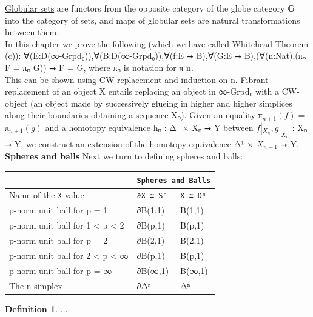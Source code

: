 \documentclass{book}
\theoremstyle{definition}
\newtheorem{definition}{Definition}
\begin{document}
\href{https://ncatlab.org/nlab/show/globular+set}{Globular sets} are functors from the opposite category of the globe category 𝔾 into the category of sets, and maps of globular sets are natural transformations between them.\\

In this chapter we prove the following (which we have called Whitehead Theorem (c)): ∀(E:D(∞-Grpd₀)),∀(B:D(∞-Grpd₀)),∀(f:E ⭢ B),∀(G:E ⭢ B),(∀(n:Nat),(πₙ F = πₙ G)) ⭢ F = G, where πₙ is notation for π n.\\

This can be shown using CW-replacement and induction on n. Fibrant replacement of an object X entails replacing an object in ∞-Grpd₀ with a CW-object (an object made by successively glueing in higher and higher simplices along their boundaries obtaining a sequence Xₙ). Given an equality π${}_{n+1}(f) = $π${}_{n+1}(g)$ and a homotopy equivalence hₙ : Δ¹ × Xₙ ⭢ Y between $f|_{X_n}, g|_{X_n}$ : Xₙ ⭢ Y, we construct an extension of the homotopy equivalence Δ¹ × $X_{n+1}$ ⭢ Y.\\

{\bf Spheres and balls} Next we turn to defining spheres and balls:

{
\footnotesize
\begin{center}
\begin{tabular}{||l || l || l ||} 
 \hline
  & \multicolumn{2}{||c||}{\texttt{Spheres and Balls}} \\
 \hline
 Name of the $\texttt{X}$ value & \texttt{∂X ≅ Sⁿ} & \texttt{X ≅ Dⁿ} \\
 \hline
 \hline
 p-norm unit ball for p = 1 & ∂B(1,1) & B(1,1) \\
 \hline
 p-norm unit ball for 1 < p < 2 & ∂B(p,1) & B(p,1) \\
 \hline
 p-norm unit ball for p = 2 & ∂B(2,1) & B(2,1) \\
 \hline
 p-norm unit ball for 2 < p < ∞ & ∂B(p,1) & B(p,1) \\
 \hline
 p-norm unit ball for p = ∞ & ∂B(∞,1) & B(∞,1) \\
 \hline
 The n-simplex & ∂Δⁿ & Δⁿ \\
 \hline
 \hline
\end{tabular}
\end{center}
}

\begin{definition}
...
\end{definition}
\end{document}

